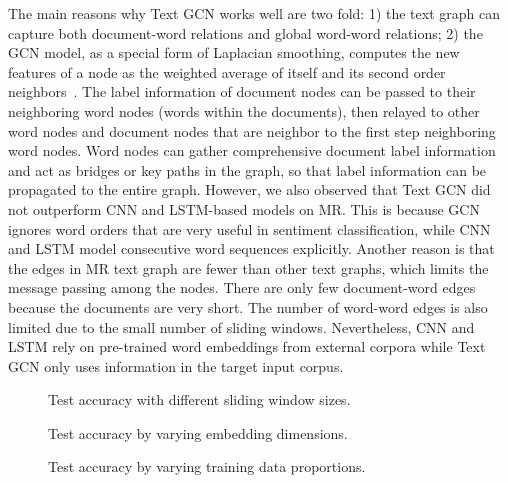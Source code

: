 \documentclass[letterpaper]{article} \usepackage{aaai19}  \usepackage{times}  \usepackage{helvet}  \usepackage{courier}  \usepackage{url}  \usepackage{graphicx}  \frenchspacing  \usepackage{amsmath}
\begin{document}
The main reasons why Text GCN works well are two fold: 1) the text graph can capture both document-word relations and global word-word relations; 2) the GCN model, as a special form of Laplacian smoothing, computes the new features of a node as the weighted average of itself and its second order neighbors~\cite{DBLP:conf/aaai/LiHW18}. The label information of document nodes can be passed to their neighboring word nodes (words within the documents), then relayed to other word nodes and document nodes that are neighbor to the first step neighboring word nodes. Word nodes can gather comprehensive document label information and act as bridges or key paths in the graph, so that label information can be propagated to the entire graph. However, we also observed that Text GCN did not outperform CNN and LSTM-based models on MR. This is because GCN ignores word orders that are very useful in sentiment classification, while CNN and LSTM model consecutive word sequences explicitly. Another reason is that the edges in MR text graph are fewer than other text graphs, which limits the message passing among the nodes. There are only few document-word edges because the documents are very short. The number of word-word edges is also limited due to the small number of sliding windows. Nevertheless, CNN and LSTM rely on pre-trained word embeddings from external corpora while Text GCN only uses information in the target input corpus.


\begin{figure}[!htb]
\centering
{}
\caption{Test accuracy with different sliding window sizes.}
\label{fig:swin}
\end{figure}

\begin{figure}[!htb]
\centering
{}
\caption{Test accuracy by varying embedding dimensions.}
\label{fig:edim} \end{figure}


\begin{figure}[t]
\centering
{}
\caption{Test accuracy by varying training data proportions.}
\label{fig:proportion}
\end{figure}
\end{document}
